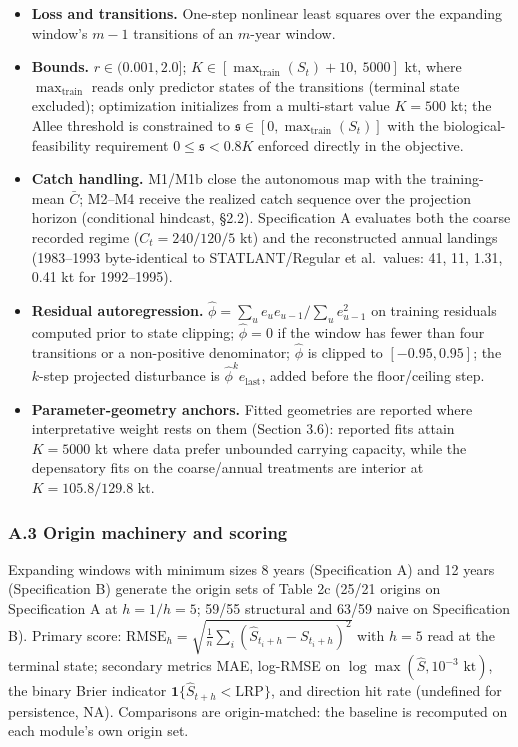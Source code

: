 \documentclass[11pt]{article}
\providecommand{\tightlist}{\setlength{\itemsep}{0.2em}\setlength{\parskip}{0pt}}
\begin{document}
\begin{itemize}
\tightlist
\item
  \textbf{Loss and transitions.} One-step nonlinear least squares over
  the expanding window's \(m-1\) transitions of an \(m\)-year window.
\item
  \textbf{Bounds.} \(r \in (0.001, 2.0]\);
  \(K \in [\max_{\mathrm{train}}(S_t) + 10,\ 5000]\) kt, where
  \(\max_{\mathrm{train}}\) reads only predictor states of the
  transitions (terminal state excluded); optimization initializes from a
  multi-start value \(K = 500\) kt; the Allee threshold is constrained
  to \(\mathfrak{s} \in [0, \max_{\mathrm{train}}(S_t)]\) with the
  biological-feasibility requirement \(0 \le \mathfrak{s} < 0.8K\)
  enforced directly in the objective.
\item
  \textbf{Catch handling.} M1/M1b close the autonomous map with the
  training-mean \(\bar{C}\); M2--M4 receive the realized catch sequence
  over the projection horizon (conditional hindcast, §2.2).
  Specification A evaluates both the coarse recorded regime
  (\(C_t = 240 / 120 / 5\) kt) and the reconstructed annual landings
  (1983--1993 byte-identical to STATLANT/Regular et al.~values: 41, 11,
  1.31, 0.41 kt for 1992--1995).
\item
  \textbf{Residual autoregression.}
  \(\hat\phi = \sum_u e_u e_{u-1} \big/ \sum_u e_{u-1}^2\) on training
  residuals computed prior to state clipping; \(\hat\phi=0\) if the
  window has fewer than four transitions or a non-positive denominator;
  \(\hat\phi\) is clipped to \([-0.95, 0.95]\); the \(k\)-step projected
  disturbance is \(\hat\phi^k e_{\mathrm{last}}\), added before the
  floor/ceiling step.
\item
  \textbf{Parameter-geometry anchors.} Fitted geometries are reported
  where interpretative weight rests on them (Section 3.6): reported fits
  attain \(K = 5000\) kt where data prefer unbounded carrying capacity,
  while the depensatory fits on the coarse/annual treatments are
  interior at \(K = 105.8/129.8\) kt.
\end{itemize}

\subsubsection{A.3 Origin machinery and
scoring}\label{a.3-origin-machinery-and-scoring}

Expanding windows with minimum sizes 8 years (Specification A) and 12
years (Specification B) generate the origin sets of Table 2c (25/21
origins on Specification A at \(h=1/h=5\); 59/55 structural and 63/59
naive on Specification B). Primary score:
\(\mathrm{RMSE}_h = \sqrt{\frac{1}{n}\sum_i (\hat S_{t_i+h} - S_{t_i+h})^2}\)
with \(h=5\) read at the terminal state; secondary metrics MAE, log-RMSE
on \(\log\max(\hat S, 10^{-3}\text{ kt})\), the binary Brier indicator
\(\mathbf{1}\{\hat S_{t+h}<\mathrm{LRP}\}\), and direction hit rate
(undefined for persistence, NA). Comparisons are origin-matched: the
baseline is recomputed on each module's own origin set.
\end{document}

